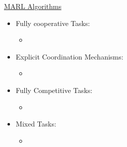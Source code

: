 \underline{MARL Algorithms}
\begin{itemize}[noitemsep,nolistsep]
	\item Fully cooperative Tasks:
	\begin{itemize}[noitemsep,nolistsep]
		\item 
	\end{itemize}
	\item Explicit Coordination Mechanisms:
	\begin{itemize}[noitemsep,nolistsep]
		\item 
	\end{itemize}
	\item Fully Competitive Tasks:
	\begin{itemize}[noitemsep,nolistsep]
		\item 
	\end{itemize}
	\item Mixed Tasks:
	\begin{itemize}[noitemsep,nolistsep]
		\item 
	\end{itemize}
\end{itemize}

